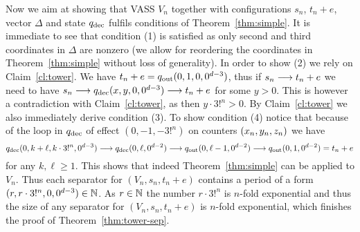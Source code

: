 Now we aim at showing that VASS $V_n$ together with configurations $s_n$, $t_n+e$,
vector $\Delta$ and state $q_{\textup{dec}}$ fulfils conditions of Theorem~\ref{thm:simple}.
It is immediate to see that condition (1) is satisfied as only second and third coordinates in $\Delta$ are nonzero
(we allow for reordering the coordinates in Theorem~\ref{thm:simple} without loss of generality).
In order to show (2) we rely on Claim~\ref{cl:tower}. We have $t_n + e = q_{\textup{out}}(0, 1, 0, 0^{d-3})$,
thus if $s_n \longrightarrow t_n + e$ we need to have $s_n \longrightarrow q_{\textup{dec}}(x, y, 0, 0^{d-3}) \longrightarrow t_n + e$
for some $y > 0$. This is however a contradiction with Claim~\ref{cl:tower}, as then $y \cdot 3!^n > 0$.
By Claim~\ref{cl:tower} we also immediately derive condition (3). To show condition (4) notice
that because of the loop in $q_{\textup{dec}}$ of effect $(0, -1, -3!^n)$ on counters $(x_n, y_n, z_n)$
we have
\[
q_{\textup{dec}}(0, k+\ell, k \cdot 3!^n, 0^{d-3}) \longrightarrow q_{\textup{dec}}(0, \ell, 0^{d-2}) \longrightarrow q_{\textup{out}}(0, \ell-1, 0^{d-2})
\longrightarrow q_{\textup{out}}(0, 1, 0^{d-2}) = t_n + e 
\]
for any $k, \ell \geq 1$. This shows that indeed Theorem~\ref{thm:simple} can be applied to $V_n$.
Thus each separator for $(V_n, s_n, t_n + e)$ contains a period of a form $(r, r \cdot 3!^n, 0, 0^{d-3}) \in \mathbb{N}$.
As $r \in \mathbb{N}$ the number $r \cdot 3!^n$ is $n$-fold exponential and thus the size of any separator for $(V_n, s_n, t_n+e)$
is $n$-fold exponential, which finishes the proof of Theorem~\ref{thm:tower-sep}.

